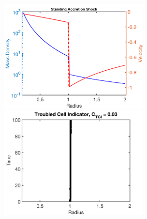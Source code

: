 \documentclass[letterpaper]{jpconf}
\begin{document}
\begin{figure}[h]
  \centering
  \begin{minipage}{18pc}
    \includegraphics[width=18pc]{./Figures/SAS_Astronum_2018}
  \end{minipage}\hspace{0.5pc}%
  \begin{minipage}{18pc}
    \includegraphics[width=18pc]{./Figures/SAS_TCI_Astronum_2018}
  \end{minipage} \\
  \begin{minipage}{36pc}

\end{minipage}
\end{figure}
\end{document}
